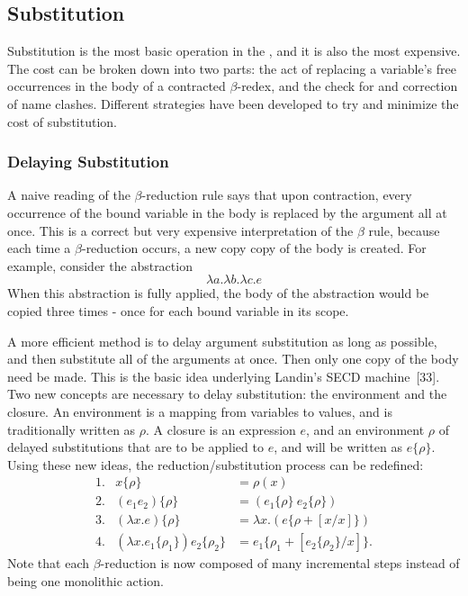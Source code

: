 \subsection{Substitution}

Substitution is the most basic operation in the \lambdacalculus, and it is also
the most expensive. The cost can be broken down into two parts: the act of
replacing a variable's free occurrences in the body of a contracted
\(\beta\)-redex, and the check for and correction of name clashes. Different
strategies have been developed to try and minimize the cost of substitution.

\subsubsection*{Delaying Substitution}

A naive reading of the \(\beta\)-reduction rule says that upon contraction,
every occurrence of the bound variable in the body is replaced by the argument
all at once. This is a correct but very expensive interpretation of the
\(\beta\) rule, because each time a \(\beta\)-reduction occurs, a new copy copy
of the body is created. For example, consider the abstraction
\[
\lambda a.\lambda b.\lambda c.e
\]
When this abstraction is fully applied, the body of the abstraction would be
copied three times - once for each bound variable in its scope.

A more efficient method is to delay argument substitution as long as possible,
and then substitute all of the arguments at once. Then only one copy of the body
need be made. This is the basic idea underlying Landin's SECD machine~[33]. Two
new concepts are necessary to delay substitution: the environment and the
closure. An environment is a mapping from variables to values, and is
traditionally written as \(\rho\). A closure is an expression \(e\), and an
environment \(\rho\) of delayed substitutions that are to be applied to \(e\),
and will be written as \(e\{\rho\}\). Using these new ideas, the
reduction/substitution process can be redefined:
\[
\begin{array}{rcl}
1. & x\{\rho\} &= \rho(x)\\
2. & (e_1e_2)\{\rho\} &= (e_1\{\rho\}\ e_2\{\rho\})\\
3. & (\lambda x.e)\{\rho\} &= \lambda x.(e\{\rho + [x/x]\})\\
4. & (\lambda x.e_1\{\rho_1\})e_2\{\rho_2\}
   &= e_1\{\rho_1 + [e_2\{\rho_2\}/x]\}.
\end{array}
\]
Note that each \(\beta\)-reduction is now composed of many incremental steps
instead of being one monolithic action.

